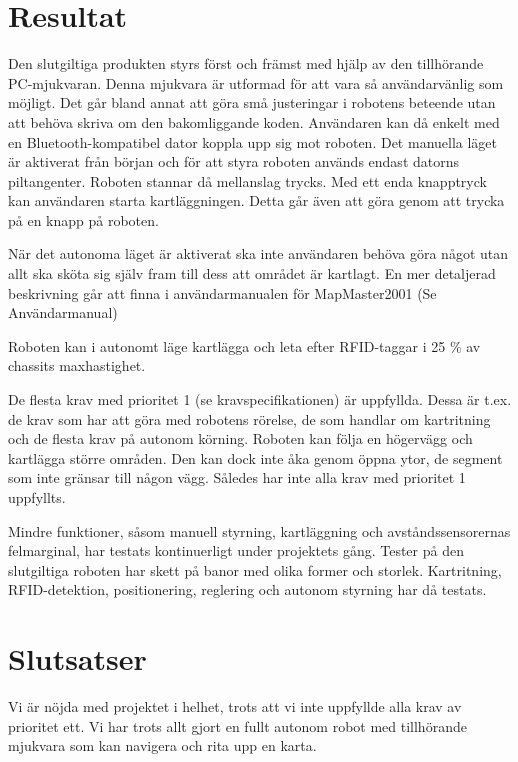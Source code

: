 \documentclass[a4paper,12pt,fleqn]{article}
\begin{document}
\newpage
\section{Resultat}

Den slutgiltiga produkten styrs först och främst med hjälp av den tillhörande PC-mjukvaran. Denna mjukvara är utformad för att vara så användarvänlig som möjligt. Det går bland annat att göra små justeringar i robotens beteende utan att behöva skriva om den bakomliggande koden. Användaren kan då enkelt med en Bluetooth-kompatibel dator koppla upp sig mot roboten. Det manuella läget är aktiverat från början och för att styra roboten används endast datorns piltangenter. Roboten stannar då mellanslag trycks. Med ett enda knapptryck kan användaren starta kartläggningen. Detta går även att göra genom att trycka på en knapp på roboten.

När det autonoma läget är aktiverat ska inte användaren behöva göra något utan allt ska sköta sig själv fram till dess att området är kartlagt. En mer detaljerad beskrivning går att finna i användarmanualen för MapMaster2001 (Se Användarmanual)


Roboten kan i autonomt läge kartlägga och leta efter RFID-taggar i 25 \% av chassits maxhastighet.

De flesta krav med prioritet 1 (se kravspecifikationen) är uppfyllda. Dessa är t.ex. de krav som har att göra med robotens rörelse, de som handlar om kartritning och de flesta krav på autonom körning. Roboten kan följa en högervägg och kartlägga större områden. Den kan dock inte åka genom öppna ytor, de segment som inte gränsar till någon vägg. Således har inte alla krav med prioritet 1 uppfyllts. 


Mindre funktioner, såsom manuell styrning, kartläggning och avståndssensorernas felmarginal, har testats kontinuerligt under projektets gång. Tester på den slutgiltiga roboten har skett på banor med olika former och storlek. Kartritning, RFID-detektion, positionering, reglering och autonom styrning har då testats.


\newpage
\section{Slutsatser}
Vi är nöjda med projektet i helhet, trots att vi inte uppfyllde alla krav av prioritet ett. Vi har trots allt gjort en fullt autonom robot med tillhörande mjukvara som kan navigera och rita upp en karta. 
\end{document}
